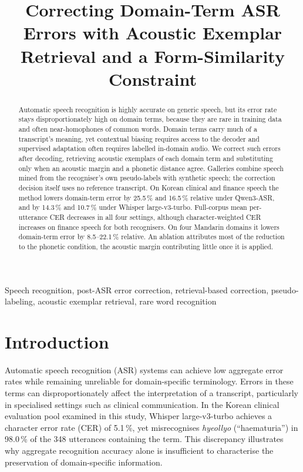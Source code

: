 \documentclass{article}
\title{Correcting Domain-Term ASR Errors with Acoustic Exemplar Retrieval and a Form-Similarity Constraint}
\begin{document}
\ninept
%
\maketitle
%
\begin{abstract}
Automatic speech recognition is highly accurate on generic speech, but its error rate stays disproportionately high on domain terms, because they are rare in training data and often near-homophones of common words. Domain terms carry much of a transcript's meaning, yet contextual biasing requires access to the decoder and supervised adaptation often requires labelled in-domain audio. We correct such errors after decoding, retrieving acoustic exemplars of each domain term and substituting only when an acoustic margin and a phonetic distance agree. Galleries combine speech mined from the recogniser's own pseudo-labels with synthetic speech; the correction decision itself uses no reference transcript. On Korean clinical and finance speech the method lowers domain-term error by 25.5\,\% and 16.5\,\% relative under Qwen3-ASR, and by 14.3\,\% and 10.7\,\% under Whisper large-v3-turbo. Full-corpus mean per-utterance CER decreases in all four settings, although character-weighted CER increases on finance speech for both recognisers. On four Mandarin domains it lowers domain-term error by 8.5--22.1\,\% relative. An ablation attributes most of the reduction to the phonetic condition, the acoustic margin contributing little once it is applied.
\end{abstract}

%
\begin{keywords}
Speech recognition, post-ASR error correction, retrieval-based correction, pseudo-labeling, acoustic exemplar retrieval, rare word recognition 
\end{keywords}
%
\section{Introduction}
\label{sec:intro}

Automatic speech recognition (ASR) systems can achieve low aggregate error rates while remaining unreliable for domain-specific terminology. Errors in these terms can disproportionately affect the interpretation of a transcript, particularly in specialised settings such as clinical communication. In the Korean clinical evaluation pool examined in this study, Whisper large-v3-turbo achieves a character error rate (CER) of 5.1\,\%, yet misrecognises \emph{hyeollyo} (``haematuria'') in 98.0\,\% of the 348 utterances containing the term. This discrepancy illustrates why aggregate recognition accuracy alone is insufficient to characterise the preservation of domain-specific information.
\end{document}
